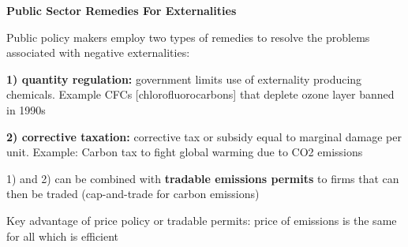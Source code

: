 \documentclass[landscape]{slides}
\begin{document}

\begin{slide}
\begin{center}
{\bf Public Sector Remedies For Externalities}%
\end{center}

Public policy makers employ two types of remedies to resolve the problems associated with negative externalities:

\textbf{1) quantity regulation:} government limits use of externality producing chemicals.
Example CFCs [chlorofluorocarbons] that deplete ozone layer banned in 1990s

\textbf{2) corrective taxation:} corrective tax or subsidy equal to marginal damage per unit.
Example: Carbon tax to fight global warming due to CO2 emissions

1) and 2) can be combined with \textbf{tradable emissions permits} to firms that can then be traded (cap-and-trade for carbon
emissions)

Key advantage of price policy or tradable permits: price of emissions is the same for all which is efficient


\end{slide}

\begin{slide}

\end{slide}


%
\end{document}
